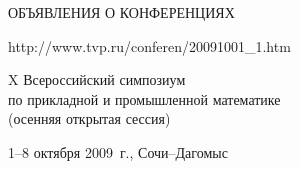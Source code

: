 \documentclass[10pt]{book}
\begin{document}
\Rus

\nwt


\begin{center}

{\prgsh\LARGE
ОБЪЯВЛЕНИЯ О КОНФЕРЕНЦИЯХ}

\end{center}

\vspace*{6pt}
\begin{flushright}
{\prg http://www.tvp.ru/conferen/20091001\_1.htm}
\end{flushright}


\begin{center}\prg
\Large
X Всероссийский симпозиум\\ по прикладной и промышленной математике\\
(осенняя открытая сессия)

\end{center}

\begin{center}\prg
1--8 октября 2009~г., Сочи--Дагомыс
\end{center}



\smallskip
\end{document}
